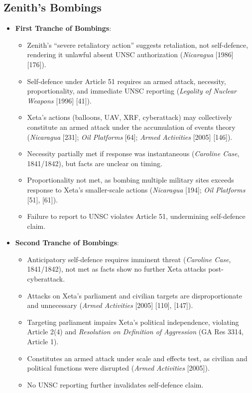 \subsection{Zenith’s Bombings}
\begin{itemize}
    \item \textbf{First Tranche of Bombings}:
    \begin{itemize}
        \item Zenith’s “severe retaliatory action” suggests retaliation, not self-defence, rendering it unlawful absent UNSC authorization (\textit{Nicaragua} [1986] [176]).
        \item Self-defence under Article 51 requires an armed attack, necessity, proportionality, and immediate UNSC reporting (\textit{Legality of Nuclear Weapons} [1996] [41]).
        \item Xeta’s actions (balloons, UAV, XRF, cyberattack) may collectively constitute an armed attack under the accumulation of events theory (\textit{Nicaragua} [231]; \textit{Oil Platforms} [64]; \textit{Armed Activities} [2005] [146]).
        \item Necessity partially met if response was instantaneous (\textit{Caroline Case}, 1841/1842), but facts are unclear on timing.
        \item Proportionality not met, as bombing multiple military sites exceeds response to Xeta’s smaller-scale actions (\textit{Nicaragua} [194]; \textit{Oil Platforms} [51], [61]).
        \item Failure to report to UNSC violates Article 51, undermining self-defence claim.
    \end{itemize}
    \item \textbf{Second Tranche of Bombings}:
    \begin{itemize}
        \item Anticipatory self-defence requires imminent threat (\textit{Caroline Case}, 1841/1842), not met as facts show no further Xeta attacks post-cyberattack.
        \item Attacks on Xeta’s parliament and civilian targets are disproportionate and unnecessary (\textit{Armed Activities} [2005] [110], [147]).
        \item Targeting parliament impairs Xeta’s political independence, violating Article 2(4) and \textit{Resolution on Definition of Aggression} (GA Res 3314, Article 1).
        \item Constitutes an armed attack under scale and effects test, as civilian and political functions were disrupted (\textit{Armed Activities} [2005]).
        \item No UNSC reporting further invalidates self-defence claim.
    \end{itemize}
\end{itemize}

